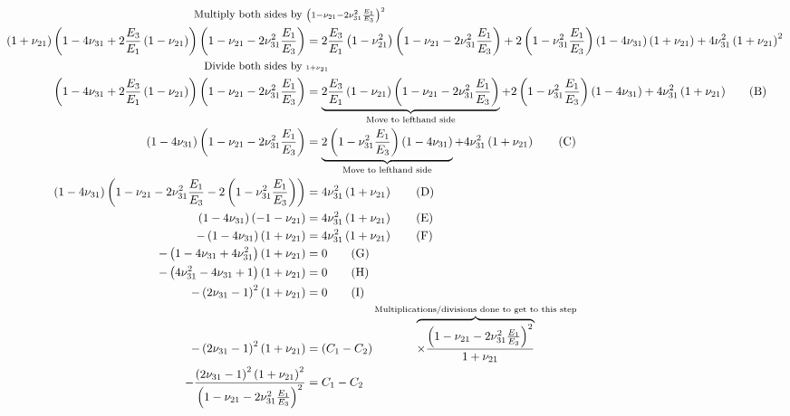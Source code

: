 \documentclass{article}
\begin{document}
\begin{align*} 
\small{ \text{Multiply both sides by }}& \scriptstyle{\left( 1-\nu_{21}-2\nu_{31}^2\frac{E_1}{E_3} \right)^2} \\
{
\left( 1+\nu_{21} \right) \left( 1-4\nu_{31} + 2 \frac{E_3}{E_1} \left( 1-\nu_{21} \right) \right)  \left( 1-\nu_{21}-2\nu_{31}^2\frac{E_1}{E_3}  \right) }
&= { 2 \frac{E_3}{E_1} \left( 1-\nu_{21}^2 \right) \left( 1-\nu_{21}-2\nu_{31}^2\frac{E_1}{E_3}  \right) + 2 \left( 1-\nu_{31}^2 \frac{E_1}{E_3} \right) \left(1-4\nu_{31} \right) \left(1+\nu_{21}\right) + 4\nu_{31}^2 \left( 1+\nu_{21} \right)^2  } \\
\small{\text{Divide both sides by }}&\scriptscriptstyle{1+\nu_{21}}
\\ {
\left( 1-4\nu_{31} + 2 \frac{E_3}{E_1} \left( 1-\nu_{21} \right) \right)  \left( 1-\nu_{21}-2\nu_{31}^2\frac{E_1}{E_3}  \right) }
&= {
\underbrace{2 \frac{E_3}{E_1} \left( 1-\nu_{21} \right) \left( 1-\nu_{21}-2\nu_{31}^2\frac{E_1}{E_3}  \right)}_{\text{Move to lefthand side}} + 2\left( 1-\nu_{31}^2 \frac{E_1}{E_3} \right) \left(1-4\nu_{31} \right) + 4\nu_{31}^2 \left( 1+\nu_{21} \right) }
\tag{B} \\
\left( 1-4\nu_{31} \right)  \left( 1-\nu_{21}-2\nu_{31}^2\frac{E_1}{E_3}  \right)
&=
\underbrace{2\left( 1-\nu_{31}^2 \frac{E_1}{E_3} \right) \left(1-4\nu_{31} \right)}_{\text{Move to lefthand side}} + 4\nu_{31}^2 \left( 1+\nu_{21} \right) 
\tag{C} \\
\left( 1-4\nu_{31} \right)  \left( 1-\nu_{21}-2\nu_{31}^2\frac{E_1}{E_3} -2\left( 1-\nu_{31}^2 \frac{E_1}{E_3} \right) \right)
&=
4\nu_{31}^2 \left( 1+\nu_{21} \right) 
\tag{D} \\
\left( 1-4\nu_{31} \right)  \left( -1- \nu_{21}\right) &= 4\nu_{31}^2 \left( 1+\nu_{21} \right) 
\tag{E} \\
-\left( 1-4\nu_{31} \right) \left(1+\nu_{21}\right)  &= 4\nu_{31}^2 \left( 1+\nu_{21} \right)  
\tag{F} \\
-\left( 1-4\nu_{31} +4\nu_{31}^2 \right) \left(1+\nu_{21}\right)  &= 0 
\tag{G}  \\
-\left( 4\nu_{31}^2-4\nu_{31}+1 \right) \left(1+\nu_{21}\right)  &= 0 
\tag{H} \\
-\left( 2\nu_{31}-1 \right)^2 \left(1+\nu_{21}\right)  &= 0   
\tag{I} \\
-\left( 2\nu_{31}-1 \right)^2 \left(1+\nu_{21}\right)  &= \left( C_1-C_2 \right) \overbrace{ \times \frac{\left( 1-\nu_{21}-2\nu_{31}^2\frac{E_1}{E_3}  \right)^2}{ 1+\nu_{21} } }^{\text{Multiplications/divisions } \text{done to get to this step}} \\
-\frac{ \left( 2\nu_{31}-1 \right)^2 \left(1+\nu_{21}\right)^2 }{\left( 1-\nu_{21}-2\nu_{31}^2\frac{E_1}{E_3}  \right)^2} &= C_1-C_2   
\end{align*}
\end{document}
